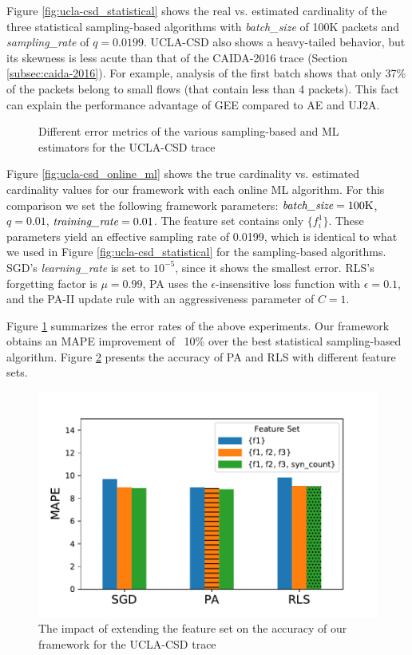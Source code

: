 		Figure \ref{fig:ucla-csd_statistical} shows the real vs. estimated cardinality of the three statistical sampling-based algorithms with \emph{batch\_size} of 100K packets and \emph{sampling\_rate} of $q=0.0199$. UCLA-CSD also shows a heavy-tailed behavior, but its skewness is less acute than that of the CAIDA-2016 trace (Section \ref{subsec:caida-2016}). For example, analysis of the first batch shows that only 37\% of the packets belong to small flows (that contain less than 4 packets). This fact can explain the performance advantage of GEE compared to AE and UJ2A.		
		
		\begin{figure}
			\centering
			\small
			
			\caption{Different error metrics of the various sampling-based and ML estimators for the UCLA-CSD trace}
			\label{fig:ucla-csd_error}
		\end{figure}
		
		Figure \ref{fig:ucla-csd_online_ml} shows the true cardinality vs. estimated cardinality values for our framework with each online ML algorithm. For this comparison we set the following framework parameters: $\emph{batch\_size} = \text{100K}$, $q=0.01$, $\emph{training\_rate} = 0.01$. The feature set contains only $\{f_i^1\}$. These parameters yield an effective sampling rate of 0.0199, which is identical to what we used in Figure \ref{fig:ucla-csd_statistical} for the sampling-based algorithms. SGD's \emph{learning\_rate} is set to $10^{-5}$, since it shows the smallest error. RLS's forgetting factor is $\mu=0.99$, PA uses the $\epsilon$-insensitive loss function with $\epsilon=0.1$, and the PA-II update rule with an aggressiveness parameter of $C=1$.
		
		Figure \ref{fig:ucla-csd_error} summarizes the error rates of the above experiments. Our framework obtains an MAPE improvement of ~10\% over the best statistical sampling-based algorithm. Figure \ref{fig:ucla-csd_features} presents the accuracy of PA and RLS with different feature sets.
		
		\begin{figure}[!tb]
			\centering
			\includegraphics[width=.49\textwidth]{img/ucla-csd_features.pdf}
			\caption{The impact of extending the feature set on the accuracy of our framework for the UCLA-CSD trace}
			\label{fig:ucla-csd_features}
		\end{figure}


